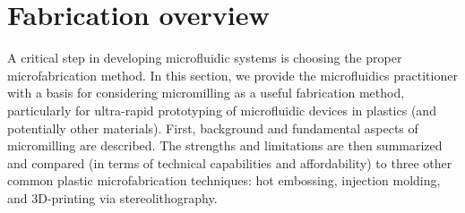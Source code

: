 \section{Fabrication overview}
A critical step in developing microfluidic systems is choosing the proper microfabrication method. In this section, we provide the microfluidics practitioner with a basis for considering micromilling as a useful fabrication method, particularly for ultra-rapid prototyping of microfluidic devices in plastics (and potentially other materials). First, background and fundamental aspects of micromilling are described. The strengths and limitations are then summarized and compared (in terms of technical capabilities and affordability) to three other common plastic microfabrication techniques: hot embossing, injection molding, and 3D-printing via stereolithography.

